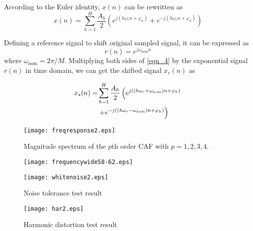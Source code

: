 \documentclass[journal,twoside]{IEEEtran}
\begin{document}
According to the Euler identity, $x(n)$ can be rewritten as
\begin{equation}
x(n)=\sum_{h=1}^{H}\dfrac{A_h}{2}\left(e^{j\left(h\omega_r n+\varphi_h\right)}+e^{-j\left(h\omega_r n+\varphi_h\right)}\right)\label{eqn_4}
\end{equation}



Defining a reference signal to shift original sampled signal, it can be expressed as 
\begin{equation}
r(n)=e^{j\omega_\mathrm{nom}n}\label{eqn_yao}
\end{equation}
where $\omega_\mathrm{nom}=2\pi /M$.
Multiplying both sides of \eqref{eqn_4} by the exponential signal $r(n)$ in time domain, we can get the shifted signal $x_s(n)$ as 

\begin{align}%
x_s(n)=&\sum_{h=1}^{H}\dfrac{A_h}{2}\left(e^{j\left((h\omega_r+\omega_\mathrm{nom})n+\varphi_h\right)}\right.\notag\\
&\left.+e^{-j\left((h\omega_r -\omega_\mathrm{nom})n+\varphi_h\right)}\right)\label{eqn_5}
\end{align}

\begin{figure}[t]
	\centering
	\texttt{[image: freqresponse2.eps]}
	\caption{Magnitude spectrum of the $p$th order CAF with $p=1,2,3,4$.}
	\label{fig_1}										
\end{figure}
\begin{figure}[t]
	\centering
	\texttt{[image: frequencywide58-62.eps]}
	\label{fig_2}										
\end{figure}
\begin{figure}[t]
	\centering
	\texttt{[image: whitenoise2.eps]}
	\caption{Noise tolerance test result}
	\label{fig_3}						
\end{figure}
\begin{figure}[t]
	\centering
	\texttt{[image: har2.eps]}
	\caption{Harmonic distortion test result}
	\label{fig_4}									
\end{figure}
\end{document}
